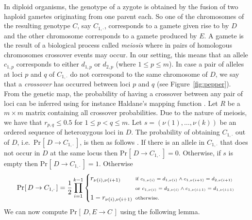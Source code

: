 \documentclass[runningheads]{llncs}
\renewcommand{\Pr}[2][]{\mathrm{Pr}_{#1} [\, #2 \, ]}
\begin{document}
In diploid organisms, the genotype of a zygote is obtained by the fusion of two haploid gametes originating from one parent each. So one of the chromosomes of the resulting genotype $C$, say $C_{1,\cdot}$, corresponds to a gamete given rise to by $D$ and the other chromosome corresponds to a gamete produced by $E$. A gamete is the result of a biological process called \emph{meiosis} where in pairs of homologous chromosomes crossover events may occur. In our setting, this means that an allele $c_{1,p}$ corresponds to either $d_{1,p}$ or $d_{2,p}$ (where $1 \leq p \leq m$). In case a pair of alleles at loci $p$ and $q$ of $C_{1,\cdot}$ do not correspond to the same chromosome of $D$, we say that a \emph{crossover} has occurred between loci $p$ and $q$ (see Figure~\ref{fig:pepper}). From the genetic map, the probability of having a crossover between any pair of loci can be inferred using for instance Haldane's mapping function \cite{Haldane:1919}.
Let $R$ be a $m \times m$ matrix containing all crossover probabilities. Due to the nature of meiosis, we have that $r_{p,q} \leq 0.5$ for $1 \leq p < q \leq m$. Let $s = (\nu(1),\dots,\nu(k))$ be an ordered sequence of heterozygous loci in $D$. The probability of obtaining $C_{1,\cdot}$ out of $D$, i.e.\ $\Pr{D \rightarrow C_{1,\cdot}}$, is then as follows \cite{Servin:2004}. If there is an allele in $C_{1,\cdot}$ that does not occur in $D$ at the same locus then $\Pr{D \rightarrow C_{1,\cdot}} = 0$. Otherwise, if $s$ is empty then $\Pr{D \rightarrow C_{1,\cdot}} = 1$. Otherwise
\begin{equation}
\label{eq:single_prob}
\Pr{D \rightarrow C_{1,\cdot}} = \frac{1}{2} \prod_{i=1}^{k-1}
\begin{cases}
r_{\nu(i),\nu(i+1)} & \hspace{-.2cm}\mbox{\scriptsize if $c_{1, \nu(i)} = d_{1, \nu(i)} \wedge c_{1, \nu(i+1)} = d_{2, \nu(i + 1)}$}\\
                     & \hspace{-.2cm}\mbox{\scriptsize or $c_{1, \nu(i)} = d_{2, \nu(i)} \wedge c_{1, \nu(i+1)} = d_{1, \nu(i + 1)}$}\\
1 - r_{\nu(i),\nu(i+1)} & \hspace{-.2cm}\mbox{\scriptsize otherwise.}
\end{cases}
\end{equation}
We can now compute $\Pr{D,E \rightarrow C}$ using the following lemma.
\end{document}
